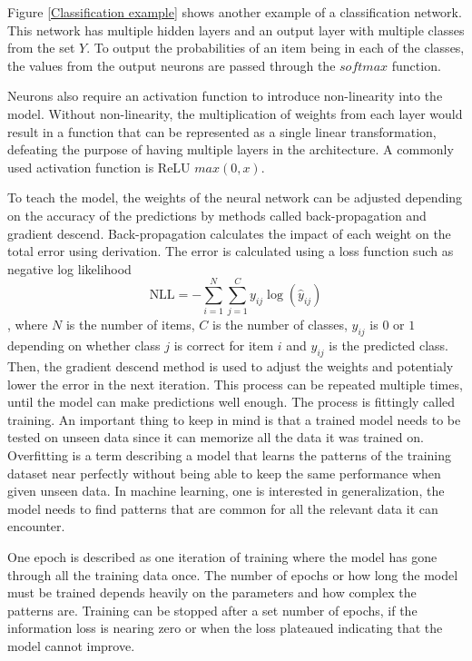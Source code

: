Figure \ref{Classification example} shows another example of a classification network. This network has multiple hidden layers and an output layer with multiple classes from the set $Y$. To output the probabilities of an item being in each of the classes, the values from the output neurons are passed through the $softmax$ function.

Neurons also require an activation function to introduce non-linearity into the model. Without non-linearity, the multiplication of weights from each layer would result in a function that can be represented as a single linear transformation, defeating the purpose of having multiple layers in the architecture. A commonly used activation function is ReLU $max(0,x)$.

To teach the model, the weights of the neural network can be adjusted depending on the accuracy of the predictions by methods called back-propagation and gradient descend. Back-propagation calculates the impact of each weight on the total error using derivation. The error is calculated using a loss function such as negative log likelihood \[\text{NLL} = - \sum_{i=1}^{N} \sum_{j=1}^{C} y_{ij} \log(\hat{y}_{ij})\], where $N$ is the number of items, $C$ is the number of classes, $y_{ij}$ is $0$ or $1$ depending on whether class $j$ is correct for item $i$ and $\hat{y}_{ij}$ is the predicted class. Then, the gradient descend method is used to adjust the weights and potentialy lower the error in the next iteration. This process can be repeated multiple times, until the model can make predictions well enough. The process is fittingly called training. An important thing to keep in mind is that a trained model needs to be tested on unseen data since it can memorize all the data it was trained on. Overfitting is a term describing a model that learns the patterns of the training dataset near perfectly without being able to keep the same performance when given unseen data. In machine learning, one is interested in generalization, the model needs to find patterns that are common for all the relevant data it can encounter.

One epoch is described as one iteration of training where the model has gone through all the training data once. The number of epochs or how long the model must be trained depends heavily on the parameters and how complex the patterns are. Training can be stopped after a set number of epochs, if the information loss is nearing zero or when the loss plateaued indicating that the model cannot improve.

